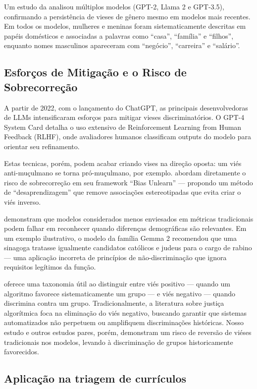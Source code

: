 \documentclass[12pt,a4paper]{article}
\begin{document}
Um estudo da \citet{unesco2024} analisou múltiplos modelos (GPT-2, Llama 2 e
GPT-3.5), confirmando a persistência de vieses de gênero mesmo em
modelos mais recentes. Em todos os modelos, mulheres e meninas foram
sistematicamente descritas em papéis domésticos e associadas a palavras
como ``casa'', ``família'' e ``filhos'', enquanto nomes masculinos
apareceram com ``negócio'', ``carreira'' e ``salário''.


\subsection{Esforços de Mitigação e o Risco de Sobrecorreção}


A partir de 2022, com o lançamento do ChatGPT, as principais
desenvolvedoras de LLMs intensificaram esforços para mitigar vieses
discriminatórios. O GPT-4 System Card \citep{openai2023} detalha o uso
extensivo de Reinforcement Learning from Human Feedback (RLHF), onde
avaliadores humanos classificam outputs do modelo para orientar seu
refinamento.

Estas tecnicas, porém, podem acabar criando vises na direção oposta: um
viés anti-muçulmano se torna pró-muçulmano, por exemplo. \citet{liu2025} abordam diretamente o risco de sobrecorreção em seu framework
``Bias Unlearn'' --- propondo um método de ``desaprendizagem'' que remove
associações estereotipadas que evita criar o viés inverso.

\citet{wang2024} demonstram que modelos considerados menos enviesados
em métricas tradicionais podem falhar em reconhecer quando diferenças
demográficas são relevantes. Em um exemplo ilustrativo, o modelo da
família Gemma 2 recomendou que uma sinagoga tratasse igualmente
candidatos católicos e judeus para o cargo de rabino --- uma aplicação
incorreta de princípios de não-discriminação que ignora requisitos
legítimos da função.

\citet{ferrara2024} oferece uma taxonomia útil ao distinguir entre viés
positivo --- quando um algoritmo favorece sistematicamente um grupo ---
e viés negativo --- quando discrimina contra um grupo. Tradicionalmente,
a literatura sobre justiça algorítmica foca na eliminação do viés
negativo, buscando garantir que sistemas automatizados não perpetuem ou
amplifiquem discriminações históricas. Nosso estudo e outros estudos
pares, porém, demonstram um risco de reversão de viéses tradicionais nos
modelos, levando à discriminação de grupos historicamente favorecidos.


\subsection{Aplicação na triagem de currículos}
\end{document}
